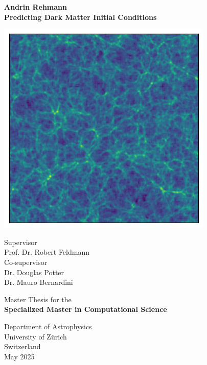 \documentclass{article}
\begin{document}
\begin{titlepage}
   \begin{center}
      \large
       \textbf{Andrin Rehmann}\\
       \vspace*{0.5cm}
        \Huge
       \textbf{Predicting Dark Matter Initial Conditions}\\
       \large
     \vspace*{0.5cm}
       


          \vspace*{1cm}

      \includegraphics[width=0.25\linewidth]{img/output.png}
              

        \large
       \vspace{1.5cm}

        Supervisor \\
        Prof. Dr. Robert Feldmann \\

        \vspace{0.5cm}
        Co-supervisor \\
        Dr. Douglas Potter \\
        Dr. Mauro Bernardini 
        
 
       \vfill
            
       Master Thesis for the\\
       \textbf{Specialized Master in Computational Science}
            
       \vspace{0.8cm}
     
            
       Department of Astrophysics\\
       University of Zürich\\
       Switzerland\\
       May 2025
            
   \end{center}
\end{titlepage}

\newpage
\end{document}
